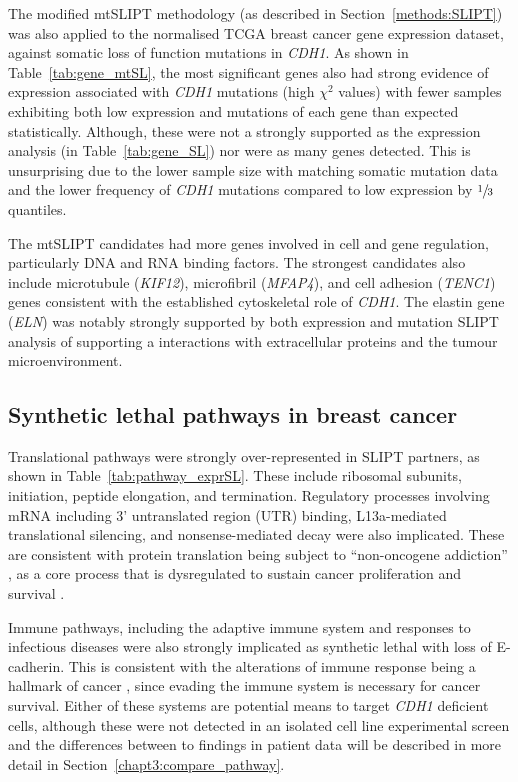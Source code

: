 The modified mtSLIPT methodology (as described in Section~\ref{methods:SLIPT}) was also applied to the normalised TCGA breast cancer gene expression dataset, against somatic loss of function mutations in \textit{CDH1}. As shown in Table~\ref{tab:gene_mtSL}, the most significant genes also had strong evidence of expression associated with \textit{CDH1} mutations (high $\chi^2$ values) with fewer samples exhibiting both low expression and mutations of each gene than expected statistically. Although, these were not a strongly supported as the expression analysis (in Table~\ref{tab:gene_SL}) nor were as many genes detected. This is unsurprising due to the lower sample size with matching somatic mutation data and the lower frequency of \textit{CDH1} mutations compared to low expression by $\sfrac{1}{3}$ quantiles.

The mtSLIPT candidates had more genes involved in cell and gene regulation, particularly DNA and RNA binding factors. The strongest candidates also include microtubule (\textit{KIF12}), microfibril (\textit{MFAP4}), and cell adhesion (\textit{TENC1}) genes consistent with the established cytoskeletal role of \textit{CDH1}. The elastin gene (\textit{ELN}) was notably strongly supported by both expression and mutation SLIPT analysis of  supporting a interactions with extracellular proteins and the tumour microenvironment.


\subsection{Synthetic lethal pathways in breast cancer} \label{chapt3:exprSL_pathways}

Translational pathways were strongly over-represented in \gls{SLIPT} partners, as shown in Table~\ref{tab:pathway_exprSL}. These include ribosomal subunits, initiation, peptide elongation, and termination. Regulatory processes involving mRNA including 3' untranslated region (UTR) binding, L13a-mediated translational silencing, and nonsense-mediated decay were also implicated. These are consistent with protein translation being subject to ``non-oncogene addiction'' \citep{Luo2009}, as a core process that is dysregulated to sustain cancer proliferation and survival \citep{Gao2015}.

Immune pathways, including the adaptive immune system and responses to infectious diseases were also strongly implicated as synthetic lethal with loss of E-cadherin. This is consistent with the alterations of immune response being a hallmark of cancer \cite{Hanahan2000}, since evading the immune system is necessary for cancer survival. Either of these systems are potential means to target \textit{CDH1} deficient cells, although these were not detected in an isolated cell line experimental screen \citep{Telford2015} and the differences between to findings in patient data will be described in more detail in Section~\ref{chapt3:compare_pathway}.

